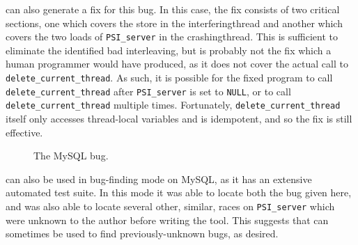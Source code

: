 
{\Technique} can also generate a fix for this bug.  In this case, the
fix consists of two critical sections, one which covers the store in
the \gls{interferingthread} and another which covers the two loads of
\texttt{PSI\_server} in the \gls{crashingthread}.  This is sufficient
to eliminate the identified bad interleaving, but is probably not the
fix which a human programmer would have produced, as it does not cover
the actual call to \texttt{delete\_current\_thread}.  As such, it is
possible for the fixed program to call
\texttt{delete\_current\_thread} after \texttt{PSI\_server} is set to
\texttt{NULL}, or to call \texttt{delete\_current\_thread} multiple
times.  Fortunately, \texttt{delete\_current\_thread} itself only
accesses thread-local variables and is idempotent, and so the fix is
still effective.

\begin{figure}
  \caption{The MySQL bug.}
  \label{fig:eval:mysqld}
\end{figure}

{\Implementation} can also be used in bug-finding mode on MySQL, as it
has an extensive automated test suite.  In this mode it was able to
locate both the bug given here, and was also able to locate several
other, similar, races on \texttt{PSI\_server} which were unknown to
the author before writing the tool.  This suggests that
{\implementation} can sometimes be used to find previously-unknown
bugs, as desired.


